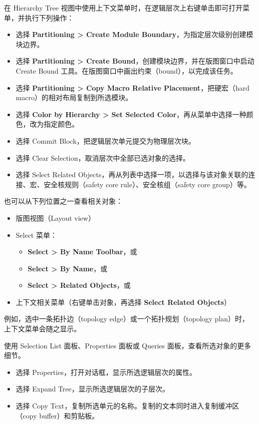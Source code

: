 在 Hierarchy Tree 视图中使用上下文菜单时，在逻辑层次上右键单击即可打开菜单，并执行下列操作：
\begin{itemize}
  \item 选择 \textbf{Partitioning > Create Module Boundary}，为指定层次级别创建模块边界。
  \item 选择 \textbf{Partitioning > Create Bound}，创建模块边界，并在版图窗口中启动 Create Bound 工具。在版图窗口中画出约束（bound），以完成该任务。
  \item 选择 \textbf{Partitioning > Copy Macro Relative Placement}，把硬宏（hard macro）的相对布局复制到所选模块。
  \item 选择 \textbf{Color by Hierarchy > Set Selected Color}，再从菜单中选择一种颜色，改为指定颜色。
  \item 选择 Commit Block，把逻辑层次单元提交为物理层次块。
  \item 选择 Clear Selection，取消层次中全部已选对象的选择。
  \item 选择 Select Related Objects，再从列表中选择一项，以选择与该对象关联的连接、宏、安全核规则（safety core rule）、安全核组（safety core group）等。
\end{itemize}

也可以从下列位置之一查看相关对象：
\begin{itemize}
  \item 版图视图（Layout view）
  \item Select 菜单：
  \begin{itemize}
    \item \textbf{Select > By Name Toolbar}，或
    \item \textbf{Select > By Name}，或
    \item \textbf{Select > Related Objects}，或
  \end{itemize}
  \item 上下文相关菜单（右键单击对象，再选择 \textbf{Select Related Objects}）
\end{itemize}

例如，选中一条拓扑边（topology edge）或一个拓扑规划（topology plan）时，上下文菜单会随之显示。

使用 Selection List 面板、Properties 面板或 Queries 面板，查看所选对象的更多细节。
\begin{itemize}
  \item 选择 Properties，打开对话框，显示所选逻辑层次的属性。
  \item 选择 Expand Tree，显示所选逻辑层次的子层次。
  \item 选择 Copy Text，复制所选单元的名称。复制的文本同时进入复制缓冲区（copy buffer）和剪贴板。
\end{itemize}

